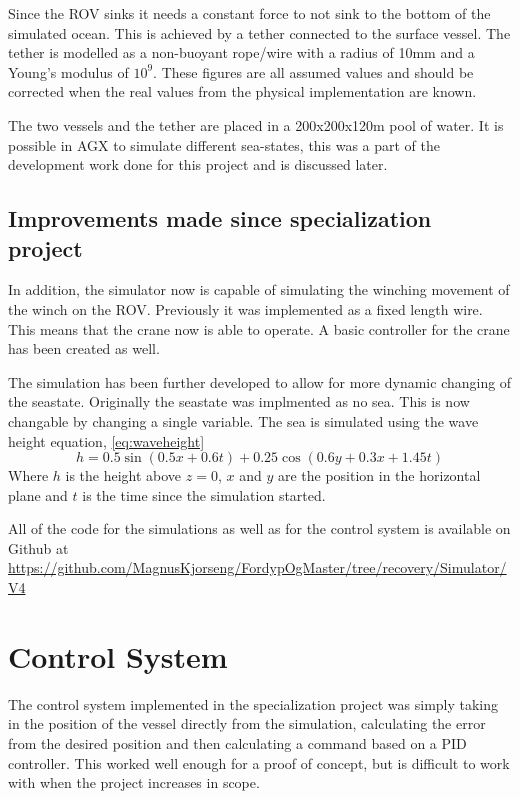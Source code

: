 \documentclass[class=article, crop=false]{standalone}
\begin{document}
Since the ROV sinks it needs a constant force to not sink to the bottom of the simulated ocean. This is achieved by a tether connected to the surface vessel. The tether is modelled as a non-buoyant rope/wire with a radius of 10mm and a Young's modulus of \(10^9\). These figures are all assumed values and should be corrected when the real values from the physical implementation are known.

The two vessels and the tether are placed in a 200x200x120m pool of water. It is possible in AGX to simulate different sea-states, this was a part of the development work done for this project and is discussed later.


\subsection{Improvements made since specialization project}
\label{sec:simulation_work}
In addition, the simulator now is capable of simulating the winching movement of the winch on the ROV. Previously it was implemented as a fixed length wire. This means that the crane now is able to operate. A basic controller for the crane has been created as well.

The simulation has been further developed to allow for more dynamic changing of the seastate. Originally the seastate was implmented as no sea. This is now changable by changing a single variable. The sea is simulated using the wave height equation, \cref{eq:waveheight}
\begin{equation}
\label{eq:waveheight}
h = 0.5\sin(0.5 x +0.6t) + 0.25\cos(0.6y + 0.3x + 1.45t)
\end{equation}
Where \(h\) is the height above \(z=0\), \(x\) and \(y\) are the position in the horizontal plane and \(t\) is the time since the simulation started.

All of the code for the simulations as well as for the control system is available on Github at \url{https://github.com/MagnusKjorseng/FordypOgMaster/tree/recovery/Simulator/V4} \cite{noauthor_fordypogmastersimulator_nodate}

\section{Control System}
The control system implemented in the specialization project was simply taking in the position of the vessel directly from the simulation, calculating the error from the desired position and then calculating a command based on a PID controller. This worked well enough for a proof of concept, but is difficult to work with when the project increases in scope.
\end{document}

